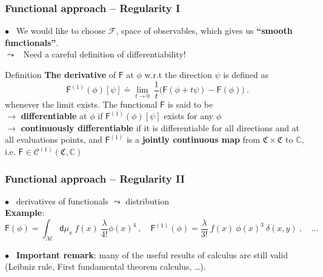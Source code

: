 \documentclass[9pt]{beamer}
\newcommand{\Ccal}{\mathcal{C}}
\newcommand{\Fcal}{\mathcal{F}}
\newcommand{\Mcal}{\mathcal{M}}
\newcommand{\Cbb}{\mathbb{C}}
\newcommand{\Crak}{\mathfrak{C}}
\newcommand{\Fsf}{\mathsf{F}}
\newcommand{\dsf}{\mathsf{d}}
\begin{document}
\begin{frame}

\frametitle{Functional approach -- Regularity I}

\vfill

$\bullet$ \ We would like to choose $\Fcal$, space of observables, which gives us \textbf{``smooth functionals''}. \\
\qquad $\leadsto$ \ Need a careful definition of differentiability!

\vfill

\begin{block}{Definition}
\textbf{The derivative} of $\Fsf$ at $\phi$ w.r.t the direction $\psi$ is defined as 
\begin{equation*}%
\Fsf^{(1)}(\phi)[\psi] \doteq \lim_{t \to 0} \ \frac{1}{t} \bigg( \Fsf(\phi + t \psi) - \Fsf(\phi) \bigg) \ .
\end{equation*}
whenever the limit exists. The functional $\Fsf$ is said to be  \\
\quad $\to$ \textbf{differentiable} at $\phi$ if $\Fsf^{(1)}(\phi)[\psi]$ exists for any $\phi$ \\
\quad $\to$ \textbf{continuously differentiable} if it is differentiable for all directions and at all evaluations points, and $\Fsf^{(1)}$ is a \textbf{jointly continuous map} from $\Crak \times \Crak$ to $\Cbb$, i.e. $\Fsf \in \Ccal^{(1)}(\Crak,\Cbb)$
\end{block}

\vfill

\end{frame}


\begin{frame}

\frametitle{Functional approach -- Regularity II}

\vfill

$\bullet$ \ derivatives of functionals $\leadsto$ distribution \\
\hspace*{8pt} \textbf{Example}: 
\begin{equation*}
\Fsf(\phi) = \int_\Mcal \dsf\mu_x \ f(x) \ \frac{\lambda}{4!} \phi(x)^4 \ , \quad \Fsf^{(1)}(\phi) =  \frac{\lambda}{3!} \ f(x) \ \phi(x)^3 \ \delta(x,y) \ , \quad \dots
\end{equation*}

\vfill

$\bullet$ \ \textbf{Important remark}: many of the useful results of calculus are still valid (Leibniz rule, First fundamental theorem calculus, \dots). \\[5pt]

\vfill


\end{frame}
\end{document}
